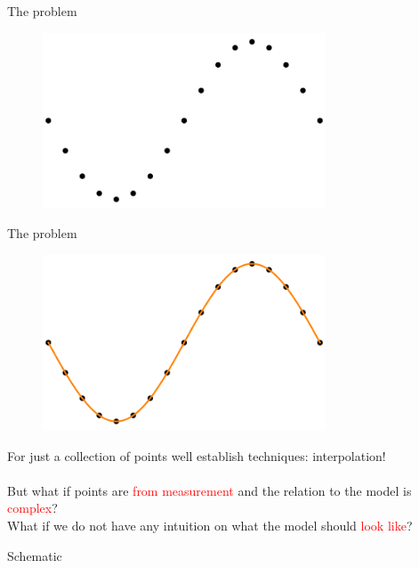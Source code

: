 \documentclass[10pt]{beamer}
\newcommand{\red}[1]{\textcolor{red}{#1}}
\renewcommand{\[}{\begin{equation*}}
\renewcommand{\]}{\end{equation*}}
\begin{document}
\begin{frame}{The problem}
\begin{figure}
    \centering
    \includegraphics[width=0.75\textwidth]{Notes/Figures/points_1.pdf}
\end{figure}
\end{frame}
\begin{frame}{The problem}
\begin{figure}
    \centering
    \includegraphics[width=0.75\textwidth]{Notes/Figures/points_2.pdf}
\end{figure}
\end{frame}

\begin{frame}{}
For just a collection of points well establish techniques: interpolation!\\
$ $\\
But what if points are \red{from measurement} and the relation to the model is \red{complex}?\\
What if we do not have any intuition on what the model should \red{look like}?
\end{frame}

\begin{frame}{Schematic}
\begin{figure}
    \centering
    
\end{figure}
\end{frame}
\end{document}
